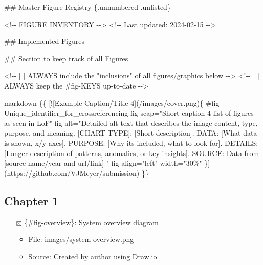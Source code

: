 \documentclass[
  11pt,
  letterpaper,
]{book}
\newenvironment{Shaded}{\begin{snugshade}}{\end{snugshade}}
\newcommand{\CommentTok}[1]{\textcolor[rgb]{0.37,0.37,0.37}{#1}}
\newcommand{\FunctionTok}[1]{\textcolor[rgb]{0.28,0.35,0.67}{#1}}
\newcommand{\InformationTok}[1]{\textcolor[rgb]{0.37,0.37,0.37}{#1}}
\newcommand{\NormalTok}[1]{\textcolor[rgb]{0.00,0.23,0.31}{#1}}
\newcommand{\OtherTok}[1]{\textcolor[rgb]{0.00,0.23,0.31}{#1}}
\providecommand{\tightlist}{%
  \setlength{\itemsep}{0pt}\setlength{\parskip}{0pt}}
\begin{document}
\begin{Shaded}
\begin{Highlighting}[]
\FunctionTok{\#\# Master Figure Registry \{.unnumbered .unlisted\}}

\CommentTok{\textless{}!{-}{-} FIGURE INVENTORY {-}{-}\textgreater{}}
\CommentTok{\textless{}!{-}{-} Last updated: 2024{-}02{-}15 {-}{-}\textgreater{}}

\FunctionTok{\#\# Implemented Figures}


\FunctionTok{\#\# Section to keep track of all Figures}

\InformationTok{\textasciigrave{}\textless{}!{-}{-} [ ] ALWAYS include the "inclusions" of all figures/graphics below {-}{-}\textgreater{}\textasciigrave{}}
\InformationTok{\textasciigrave{}\textless{}!{-}{-} [ ] ALWAYS keep the \#fig{-}KEYS up{-}to{-}date {-}{-}\textgreater{}\textasciigrave{}}

\InformationTok{\textasciigrave{}\textasciigrave{}\textasciigrave{}markdown}
\NormalTok{\{\{}
\CommentTok{[}\OtherTok{![Example Caption/Title 4}\CommentTok{](/images/cover.png)}\NormalTok{\{}
\NormalTok{    \#fig{-}Unique\_identifier\_for\_crossreferencing}
\NormalTok{    fig{-}scap="Short caption 4 list of figures as seen in LoF"}
\NormalTok{    fig{-}alt="Detailed alt text that describes the image content, type, purpose, and meaning.}
            \OtherTok{[CHART TYPE]: }\CommentTok{[}\OtherTok{Short description}\CommentTok{]}\NormalTok{.}
\NormalTok{                DATA: }\CommentTok{[}\OtherTok{What data is shown, x/y axes}\CommentTok{]}\NormalTok{.}
\NormalTok{                PURPOSE: }\CommentTok{[}\OtherTok{Why it\textquotesingle{}s included, what to look for}\CommentTok{]}\NormalTok{.}
\NormalTok{                DETAILS: }\CommentTok{[}\OtherTok{Longer description of patterns, anomalies, or key insights}\CommentTok{]}\NormalTok{.}
\NormalTok{                SOURCE: Data from }\CommentTok{[}\OtherTok{source name/year and url/link}\CommentTok{]}
\NormalTok{            "}
\NormalTok{    fig{-}align="left"}
\NormalTok{    width="30\%"}
\NormalTok{    \}](https://github.com/VJMeyer/submission)}
\NormalTok{\}\}}
\end{Highlighting}
\end{Shaded}

\subsection{Chapter 1}\label{chapter-1}

\begin{itemize}
\tightlist
\item[$\boxtimes$]
  \{\#fig-overview\}: System overview diagram

  \begin{itemize}
  \tightlist
  \item
    File: images/system-overview.png
  \item
    Source: Created by author using Draw.io
  \end{itemize}
\end{itemize}
\end{document}

